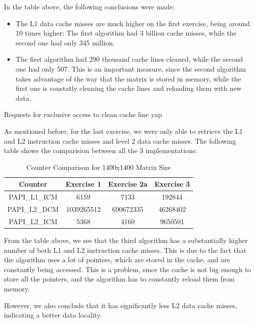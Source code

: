 \documentclass[10pt, titlepage]{extarticle}
\begin{document}
In the table above, the following conclusions were made:
\begin{itemize}
    \item The L1 data cache misses are much higher on the first exercise, being around 10 times higher: The first algorithm had 3 billion
          cache misses, while the second one had only 345 million.
    \item The first algorithm had 290 thousand cache lines cleaned, while the second one had only 507. This is an important measure, since the second algorithm takes advantage
          of the way that the matrix is stored in memory, while the first one is constatly cleaning the cache lines and reloading them with new data.
\end{itemize}Requests for exclusive access to clean cache line yap

As mentioned before, for the last exercise, we were only able to retrieve the L1 and L2 instruction cache misses and level 2 data cache misses.
The following table shows the comparision between all the 3 implementations:

\begin{table}[H]
    \centering
    \begin{tabular}{|c|c|c|c|}
        \hline
        \textbf{Counter} & \textbf{Exercise 1} & \textbf{Exercise 2a} & \textbf{Exercise 3} \\ \hline
        PAPI\_L1\_ICM    & 6159                & 7133                 & 192844              \\ \hline
        PAPI\_L2\_DCM    & 1039265512          & 690672335            & 46268402            \\ \hline
        PAPI\_L2\_ICM    & 5368                & 4160                 & 9650501             \\ \hline
    \end{tabular}
    \caption{Counter Comparison for 1400x1400 Matrix Size}
\end{table}

From the table above, we see that the third algorithm has a substantially higher number of both L1 and L2 instruction cache misses. This is due to the fact that the algorithm
uses a lot of pointers, which are stored in the cache, and are constantly being accessed.
This is a problem, since the cache is not big enough to store all the pointers, and the algorithm has to constantly reload them from memory.

However, we also conclude that it has significantly less L2 data cache misses, indicating a better data locality.
\end{document}
